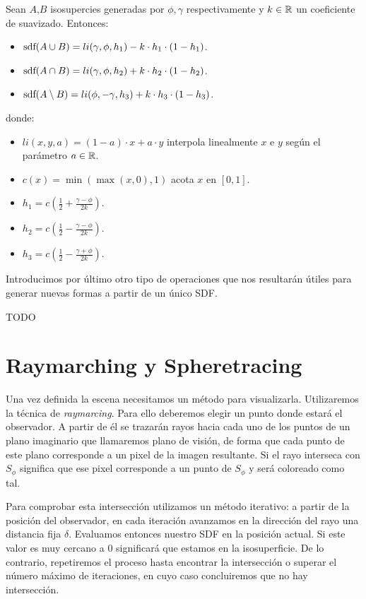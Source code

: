 \begin{proposicion}
    Sean $A$,$B$ isosupercies generadas por $\phi,\gamma$ respectivamente y $k\in \mathbb{R}$ un coeficiente de suavizado. Entonces:
    \begin{itemize}
        \item $\text{sdf}(A\cup B) = li(\gamma, \phi, h_1) - k\cdot h_1 \cdot (1-h_1)$.
        \item $\text{sdf}(A\cap B) = li(\gamma, \phi, h_2) + k\cdot h_2 \cdot (1-h_2)$.
        \item $\text{sdf}(A\setminus B) = li(\phi, -\gamma, h_3) + k\cdot h_3 \cdot (1-h_3)$.
    \end{itemize}

    donde:
    \begin{itemize}
        \item $li(x,y,a) = (1-a)\cdot x + a\cdot y$ interpola linealmente $x$ e $y$ según el parámetro $a\in\mathbb{R}$.
        \item $c(x) = \min(\max(x, 0), 1)$ acota $x$ en $[0,1]$.
        \item $h_1 = c\left(\frac{1}{2} + \frac{\gamma - \phi}{2k}\right)$.
        \item $h_2 = c\left( \frac{1}{2} - \frac{\gamma - \phi}{2k} \right)$.
        \item $h_3 = c\left( \frac{1}{2} - \frac{\gamma + \phi}{2k}\right)$.
    \end{itemize}
\end{proposicion}

Introducimos por último otro tipo de operaciones que nos resultarán útiles para generar nuevas formas a partir de un único SDF.

TODO


\section{Raymarching y Spheretracing}
Una vez definida la escena necesitamos un método para visualizarla. Utilizaremos la técnica de \textit{raymarcing}. Para ello deberemos elegir un punto donde estará el observador. A partir de él se trazarán rayos hacia cada uno de los puntos de un plano imaginario que llamaremos plano de visión, de forma que cada punto de este plano corresponde a un pixel de la imagen resultante. Si el rayo interseca con $S_\phi$ significa que ese pixel corresponde a un punto de $S_\phi$ y será coloreado como tal.\newline

Para comprobar esta intersección utilizamos un método iterativo: a partir de la posición del observador, en cada iteración avanzamos en la dirección del rayo una distancia fija $\delta$. Evaluamos entonces nuestro SDF en la posición actual. Si este valor es muy cercano a 0 significará que estamos en la isosuperficie. De lo contrario, repetiremos el proceso hasta encontrar la intersección o superar el número máximo de iteraciones, en cuyo caso concluiremos que no hay intersección.\newline

